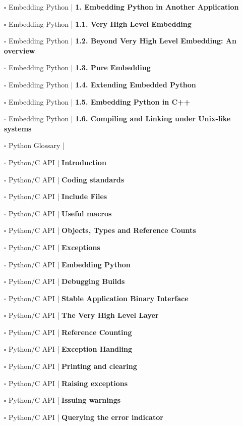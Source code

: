 \documentclass[a4, landscape, 12pt]{article}
\newcommand{\checkbox}{$\square$}%
\begin{document}
\begin{itemize}
{}
\item [\checkbox]  Embedding Python | \textbf{ 1. Embedding Python in Another Application
}
\item [\checkbox]  Embedding Python | \textbf{ 1.1. Very High Level Embedding
}
\item [\checkbox]  Embedding Python | \textbf{ 1.2. Beyond Very High Level Embedding: An overview
}
\item [\checkbox]  Embedding Python | \textbf{ 1.3. Pure Embedding
}
\item [\checkbox]  Embedding Python | \textbf{ 1.4. Extending Embedded Python
}
\item [\checkbox]  Embedding Python | \textbf{ 1.5. Embedding Python in C++
}
\item [\checkbox]  Embedding Python | \textbf{ 1.6. Compiling and Linking under Unix-like systems
}
\item [\checkbox]  Python Glossary | \textbf{
}
\item [\checkbox]  Python/C API | \textbf{ Introduction
}
\item [\checkbox]  Python/C API | \textbf{ Coding standards
}
\item [\checkbox]  Python/C API | \textbf{ Include Files
}
\item [\checkbox]  Python/C API | \textbf{ Useful macros
}
\item [\checkbox]  Python/C API | \textbf{ Objects, Types and Reference Counts
}
\item [\checkbox]  Python/C API | \textbf{ Exceptions
}
\item [\checkbox]  Python/C API | \textbf{ Embedding Python
}
\item [\checkbox]  Python/C API | \textbf{ Debugging Builds
}
\item [\checkbox]  Python/C API | \textbf{ Stable Application Binary Interface
}
\item [\checkbox]  Python/C API | \textbf{ The Very High Level Layer
}
\item [\checkbox]  Python/C API | \textbf{ Reference Counting
}
\item [\checkbox]  Python/C API | \textbf{ Exception Handling
}
\item [\checkbox]  Python/C API | \textbf{ Printing and clearing
}
\item [\checkbox]  Python/C API | \textbf{ Raising exceptions
}
\item [\checkbox]  Python/C API | \textbf{ Issuing warnings
}
\item [\checkbox]  Python/C API | \textbf{ Querying the error indicator
}
\end{itemize}
\end{document}

